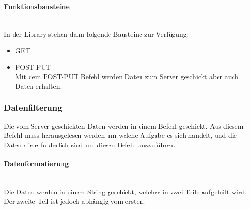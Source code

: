         \paragraph{Funktionsbausteine} \mbox{} \\
        In der Library stehen dann folgende Bausteine zur Verfügung:

        \begin{itemize}
            \item GET
            \item POST-PUT \\
            Mit dem POST-PUT Befehl werden Daten zum Server geschickt aber auch Daten erhalten. 
        \end{itemize}


    \subsubsection{Datenfilterung}
    Die vom Server geschickten Daten werden in einem Befehl geschickt. Aus diesem Befehl muss herausgelesen werden um welche Aufgabe es sich handelt, und die Daten die erforderlich sind um diesen Befehl auszuführen.

        \paragraph{Datenformatierung}\mbox{}\\
        Die Daten werden in einem String geschickt, welcher in zwei Teile aufgeteilt wird. Der zweite Teil ist jedoch abhängig vom ersten. \\
        
